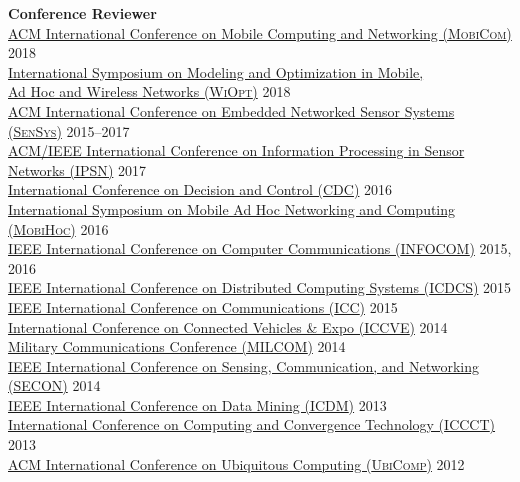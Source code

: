 {\bf Conference Reviewer}\\
{\href{https://sigmobile.org/mobicom/2018/}{ACM International Conference on Mobile Computing and Networking (\textsc{MobiCom})}} \hfill 2018\\
{\href{http://www.wi-opt.org/}{International Symposium on Modeling and Optimization in Mobile, \\\mbox{\hspace{0.4cm}} Ad Hoc and Wireless Networks (\textsc{WiOpt})}} \hfill 2018\\
{\href{http://sensys.acm.org}{ACM International Conference on Embedded Networked Sensor Systems (\textsc{SenSys})}} \hfill 2015--2017\\
{\href{http://ipsn.acm.org/2017/}{ACM/IEEE International Conference on Information Processing in Sensor Networks (\textsc{IPSN})}} \hfill 2017\\
{\href{http://cdc2016.ieeecss.org/}{International Conference on Decision and Control (\textsc{CDC})}} \hfill 2016\\
{\href{http://www.sigmobile.org/mobihoc/2016/}{International Symposium on Mobile Ad Hoc Networking and Computing (\textsc{MobiHoc})}} \hfill 2016\\
{\href{http://infocom2016.ieee-infocom.org/}{IEEE International Conference on Computer Communications (\textsc{INFOCOM})}} \hfill 2015, 2016\\
{\href{http://icdcs-2015.cse.ohio-state.edu/}{IEEE International Conference on Distributed Computing Systems (\textsc{ICDCS})}} \hfill 2015\\
{\href{http://icc2015.ieee-icc.org/}{IEEE International Conference on Communications (\textsc{ICC})}} \hfill 2015\\
{\href{http://www.iccve.org/2014/}{International Conference on Connected Vehicles \& Expo (\textsc{ICCVE})}} \hfill 2014\\
{\href{http://www.milcom.org/2014/}{Military Communications Conference (\textsc{MILCOM})}} \hfill 2014\\
{\href{http://secon2014.ieee-secon.org}{IEEE International Conference on Sensing, Communication, and Networking (\textsc{SECON})}} \hfill 2014\\
{\href{http://icdm2013.rutgers.edu}{IEEE International Conference on Data Mining (\textsc{ICDM})}} \hfill 2013\\
{\href{http://www.mnnit.ac.in/iccct2013}{International Conference on Computing and Convergence Technology (\textsc{ICCCT})}} \hfill 2013\\
{\href{http://www.ubicomp.org/ubicomp2012}{ACM International Conference on Ubiquitous Computing (\textsc{UbiComp})}} \hfill 2012\\
\vspace{-0.6cm}

